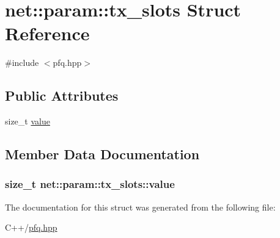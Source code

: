 \hypertarget{structnet_1_1param_1_1tx__slots}{\section{net\+:\+:param\+:\+:tx\+\_\+slots Struct Reference}
\label{structnet_1_1param_1_1tx__slots}
}


{\ttfamily \#include $<$pfq.\+hpp$>$}

\subsection*{Public Attributes}
\begin{DoxyCompactItemize}
\item 
size\+\_\+t \hyperlink{structnet_1_1param_1_1tx__slots_aa9c38079016460b21e406579485f94a1}{value}
\end{DoxyCompactItemize}


\subsection{Member Data Documentation}
\hypertarget{structnet_1_1param_1_1tx__slots_aa9c38079016460b21e406579485f94a1}{
\subsubsection[{value}]{\setlength{\rightskip}{0pt plus 5cm}size\+\_\+t net\+::param\+::tx\+\_\+slots\+::value}}\label{structnet_1_1param_1_1tx__slots_aa9c38079016460b21e406579485f94a1}


The documentation for this struct was generated from the following file\+:\begin{DoxyCompactItemize}
\item 
C++/\hyperlink{pfq_8hpp}{pfq.\+hpp}\end{DoxyCompactItemize}
